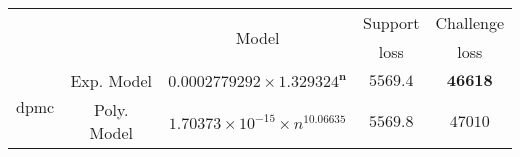 \begin{tabular}{ccccc} 
\hline 
 &  & \multirow{2}{*}{Model} & Support & Challenge\tabularnewline 
 &  &  & loss  & loss\tabularnewline 
\hline 
\hline 
\multirow{2}{*}{dpmc} & Exp. Model & $\mathbf{0.0002779292\times 1.329324^{n}}$ & $\mathbf{5569.4}$ & $\mathbf{46618}$ \tabularnewline 
 & Poly. Model & $1.70373\times10^{-15}\times n^{10.06635}$ & $5569.8$ & $47010$ \tabularnewline 
\hline 
\end{tabular} 

